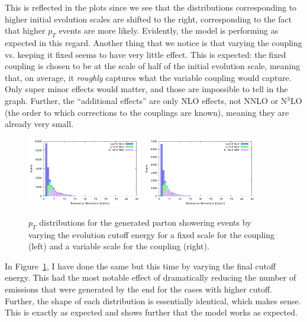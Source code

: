 This is reflected in the plots since we see that the distributions corresponding to higher initial evolution scales are shifted to the right, corresponding to the fact that higher $p_T$ events are more likely. Evidently, the model is performing as expected in this regard. Another thing that we notice is that varying the coupling vs. keeping it fixed seems to have very little effect. This is expected: the fixed coupling is chosen to be at the scale of half of the initial evolution scale, meaning that, on average, it \textit{roughly} captures what the variable coupling would capture. Only super minor effects would matter, and those are impossible to tell in the graph. Further, the ``additional effects'' are only NLO effects, not NNLO or N$^3$LO (the order to which corrections to the couplings are known), meaning they are already very small.

\begin{figure}[ht]
  \centering
  \includegraphics[width=0.45\textwidth]{./res/gfx/pt2-fixed.pdf}
  \includegraphics[width=0.45\textwidth]{./res/gfx/pt2-variable.pdf}
  \caption{$p_T$ distributions for the generated parton showering events by varying the evolution cutoff energy for a fixed scale for the coupling (left) and a variable scale for the coupling (right).}
  \label{fig:pt-dist2}
\end{figure}

In Figure~\ref{fig:pt-dist2}, I have done the same but this time by varying the final cutoff energy. This had the most notable effect of dramatically reducing the number of emissions that were generated by the end for the cases with higher cutoff. Further, the shape of each distribution is essentially identical, which makes sense. This is exactly as expected and shows further that the model works as expected.




